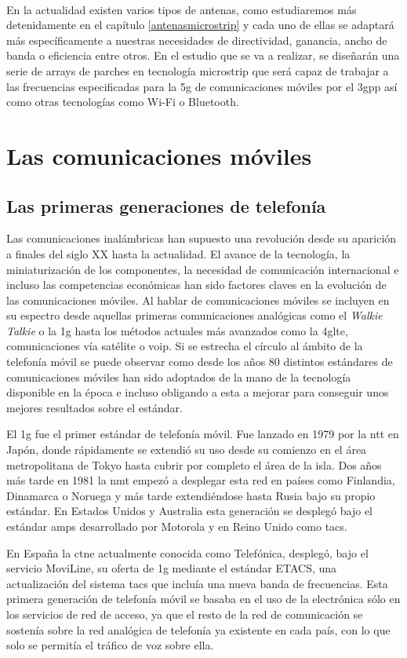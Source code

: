 \\ 
\par En la actualidad existen varios tipos de antenas, como estudiaremos más detenidamente en el capítulo \ref{antenasmicrostrip} y cada uno de ellas se adaptará más específicamente a nuestras necesidades de directividad, ganancia, ancho de banda o eficiencia entre otros. En el estudio que se va a realizar, se diseñarán una serie de  arrays de parches en tecnología microstrip que será capaz de trabajar a las frecuencias especificadas para la \gls{5g} de comunicaciones móviles por el \gls{3gpp} así como otras tecnologías como Wi-Fi o Bluetooth.

\section{Las comunicaciones móviles}
\subsection{Las primeras generaciones de telefonía}
\par Las comunicaciones inalámbricas han supuesto una revolución desde su aparición a finales del siglo XX hasta la actualidad. El avance de la tecnología, la miniaturización de los componentes, la necesidad de comunicación internacional e incluso las competencias económicas han sido factores claves en la evolución de las comunicaciones móviles. Al hablar de comunicaciones móviles se incluyen en su espectro desde aquellas primeras comunicaciones analógicas como el \textit{Walkie Talkie} o la \gls{1g} hasta los métodos actuales más avanzados como la \gls{4glte}, comunicaciones vía satélite o \gls{voip}. Si se estrecha el círculo al ámbito de la telefonía móvil se puede observar como desde los años 80 distintos estándares de comunicaciones móviles han sido adoptados de la mano de la tecnología disponible en la época e incluso obligando a esta a mejorar para conseguir unos mejores resultados sobre el estándar. 
\\
\par El \gls{1g} fue el primer estándar de telefonía móvil. Fue lanzado en 1979 por la \gls{ntt} en Japón, donde rápidamente se extendió su uso desde su comienzo en el área metropolitana de Tokyo hasta cubrir por completo el área de la isla. Dos años más tarde en 1981 la \gls{nmt} empezó a desplegar esta red en países como Finlandia, Dinamarca o Noruega y más tarde extendiéndose hasta Rusia bajo su propio estándar. En Estados Unidos y Australia esta generación se desplegó bajo el estándar \gls{amps} desarrollado por Motorola y en Reino Unido como \gls{tacs}. \cite{Wikipedia}
\\
\par En España la \gls{ctne} actualmente conocida como Telefónica, desplegó, bajo el servicio MoviLine, su oferta de \gls{1g} mediante el estándar ETACS, una actualización del sistema \gls{tacs} que incluía una nueva banda de frecuencias. Esta primera generación de telefonía móvil se basaba en el uso de la electrónica sólo en los servicios de red de acceso, ya que el resto de la red de comunicación se sostenía sobre la red analógica de telefonía ya existente en cada país, con lo que solo se permitía el tráfico de voz sobre ella. \cite{Wikipediaa}

